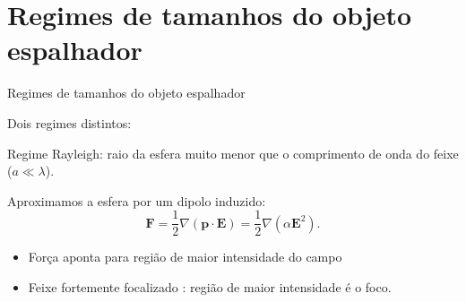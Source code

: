 \documentclass[10pt]{beamer}
\begin{document}
\section{Regimes de tamanhos do objeto espalhador}

\begin{frame}[fragile]{Regimes de tamanhos do objeto espalhador}

Dois regimes distintos: \\
    \begin{center}
        Regime Rayleigh: raio da esfera muito menor que o comprimento de onda do feixe ($a\ll\lambda$).

        Aproximamos a esfera por um dipolo induzido:
        \begin{equation}
        {\mathbf F} = \frac{1}{2}\nabla({\mathbf p}\cdot{\mathbf E})=\frac{1}{2}\nabla(\alpha{\mathbf E}^2).
        \end{equation}

	      \begin{itemize}

		        \item Força aponta para região de maior intensidade do campo

		        \item Feixe fortemente focalizado : região de maior intensidade é o foco.

	      \end{itemize}
 

    \end{center}

\end{frame}
\end{document}
